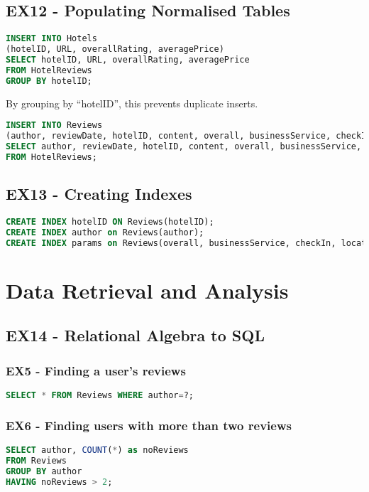 \documentclass[a4paper]{article}
\begin{document}
%
%
\subsection{EX12 - Populating Normalised Tables} 
\begin{lstlisting}[language=SQL, style=default]
INSERT INTO Hotels
(hotelID, URL, overallRating, averagePrice)
SELECT hotelID, URL, overallRating, averagePrice
FROM HotelReviews
GROUP BY hotelID;
\end{lstlisting}
By grouping by ``hotelID'', this prevents duplicate inserts.

\begin{lstlisting}[language=SQL, style=default]
INSERT INTO Reviews
(author, reviewDate, hotelID, content, overall, businessService, checkIn, cleanliness, location, rooms, service, value, noReaders, noHelpful)
SELECT author, reviewDate, hotelID, content, overall, businessService, checkIn, cleanliness, location, rooms, service, value, noReaders, noHelpful
FROM HotelReviews;
\end{lstlisting}

%
%
\subsection{EX13 - Creating Indexes}
\begin{lstlisting}[language=SQL, style=default]
CREATE INDEX hotelID ON Reviews(hotelID);
CREATE INDEX author on Reviews(author);
CREATE INDEX params on Reviews(overall, businessService, checkIn, location, rooms, service, value);
\end{lstlisting}


\section{Data Retrieval and Analysis}

%
%
\subsection{EX14 - Relational Algebra to SQL}
\subsubsection{EX5 - Finding a user's reviews}
\begin{lstlisting}[language=SQL, style=default]
SELECT * FROM Reviews WHERE author=?;
\end{lstlisting}

\subsubsection{EX6 - Finding users with more than two reviews}
\begin{lstlisting}[language=SQL, style=default]
SELECT author, COUNT(*) as noReviews
FROM Reviews
GROUP BY author
HAVING noReviews > 2;
\end{lstlisting}
\end{document}
